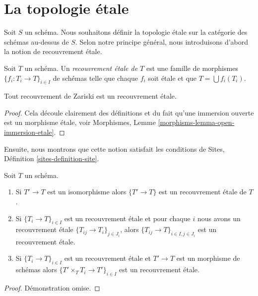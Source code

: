 \section{La topologie étale}
\label{section-etale}

\noindent
Soit $S$ un schéma. Nous souhaitons définir la topologie étale sur la catégorie des schémas au-dessus de $S$. Selon notre principe général, nous introduisons d'abord la notion de recouvrement étale.

\begin{definition}
\label{definition-etale-covering}
Soit $T$ un schéma. Un {\it recouvrement étale de $T$} est une famille de morphismes $\{f_i : T_i \to T\}_{i \in I}$ de schémas telle que chaque $f_i$ soit étale et que $T = \bigcup f_i(T_i)$.
\end{definition}

\begin{lemma}
\label{lemma-zariski-etale}
Tout recouvrement de Zariski est un recouvrement étale.
\end{lemma}

\begin{proof}
Cela découle clairement des définitions et du fait qu'une immersion ouverte est un morphisme étale, voir Morphismes, Lemme \ref{morphisms-lemma-open-immersion-etale}.
\end{proof}

\noindent
Ensuite, nous montrons que cette notion satisfait les conditions de Sites, Définition \ref{sites-definition-site}.

\begin{lemma}
\label{lemma-etale}
Soit $T$ un schéma.
\begin{enumerate}
\item Si $T' \to T$ est un isomorphisme alors $\{T' \to T\}$ est un recouvrement étale de $T$.
\item Si $\{T_i \to T\}_{i\in I}$ est un recouvrement étale et pour chaque $i$ nous avons un recouvrement étale $\{T_{ij} \to T_i\}_{j\in J_i}$, alors $\{T_{ij} \to T\}_{i \in I, j\in J_i}$ est un recouvrement étale.
\item Si $\{T_i \to T\}_{i\in I}$ est un recouvrement étale et $T' \to T$ est un morphisme de schémas alors $\{T' \times_T T_i \to T'\}_{i\in I}$ est un recouvrement étale.
\end{enumerate}
\end{lemma}

\begin{proof}
Démonstration omise.
\end{proof}


